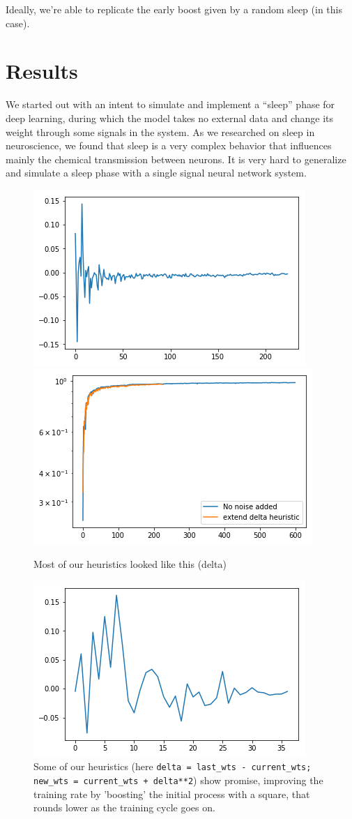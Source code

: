\documentclass[a1,landscape]{a0poster}
\begin{document}
\begin{multicols}{4}
  Ideally, we're able to replicate the early boost given by a random sleep (in this case).
    
    
    \section*{Results}
    We started out with an intent to simulate and implement a “sleep” phase for deep learning, during which the model takes no external data and change its weight through some signals in the system. As we researched on sleep in neuroscience\cite{schenck2002rem}, we found that sleep is a very complex behavior that influences mainly the chemical transmission between neurons\cite{ross1984tonic}. It is very hard to generalize and simulate a sleep phase with a single signal neural network system.    
    \begin{figure}[H]
    	\centering
    	\includegraphics[width=0.4\linewidth]{img/result}
    	\includegraphics[width=0.4\linewidth]{img/heuristic_result}
    	\caption{Most of our heuristics looked like this (delta)}
    	\label{fig:result}
    \end{figure}
  \begin{figure}[H]
  	\centering
  	\includegraphics[width=0.4\linewidth]{img/promising}
  	\caption{Some of our heuristics (here \texttt{delta = last\_wts - current\_wts; new\_wts = current\_wts + delta**2}) show promise, improving the training rate by 'boosting' the initial process with a square, that rounds lower as the training cycle goes on.}
  	\label{fig:promising}
  \end{figure}
  

\end{multicols}
\end{document}
